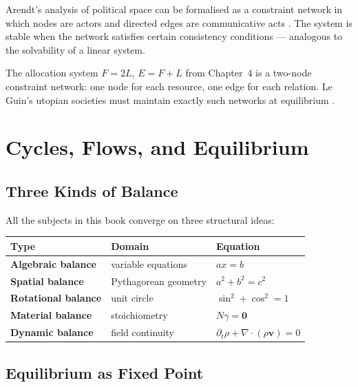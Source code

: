 \documentclass[11pt, openany]{book}
\theoremstyle{plain}
\theoremstyle{definition}
\theoremstyle{remark}
\begin{document}
\begin{myexample}
Arendt's analysis of political space can be formalised as a constraint network
in which nodes are actors and directed edges are communicative acts
\citep{Arendt1958}. The system is stable when the network satisfies certain
consistency conditions --- analogous to the solvability of a linear system.
\end{myexample}

\begin{myexample}
The allocation system
$F=2L$, $E=F+L$
from Chapter~4 is a two-node constraint network: one node for each resource,
one edge for each relation. Le Guin's utopian societies must maintain exactly
such networks at equilibrium \citep{LeGuin1974}.
\end{myexample}

\chapter{Cycles, Flows, and Equilibrium}

\section{Three Kinds of Balance}

All the subjects in this book converge on three structural ideas:

\begin{center}
\renewcommand{\arraystretch}{1.6}
\begin{tabular}{>{\bfseries}p{3cm} p{4cm} p{5cm}}
\toprule
\color{ctBlue}Type & \color{ctBlue}Domain & \color{ctBlue}Equation \\
\midrule
Algebraic balance & variable equations & $ax=b$ \\
Spatial balance & Pythagorean geometry & $a^2+b^2=c^2$ \\
Rotational balance & unit circle & $\sin^2+\cos^2=1$ \\
Material balance & stoichiometry & $N\gamma=\mathbf{0}$ \\
Dynamic balance & field continuity & $\partial_t\rho+\nabla\cdot(\rho\mathbf{v})=0$ \\
\bottomrule
\end{tabular}
\end{center}

\section{Equilibrium as Fixed Point}
\end{document}
